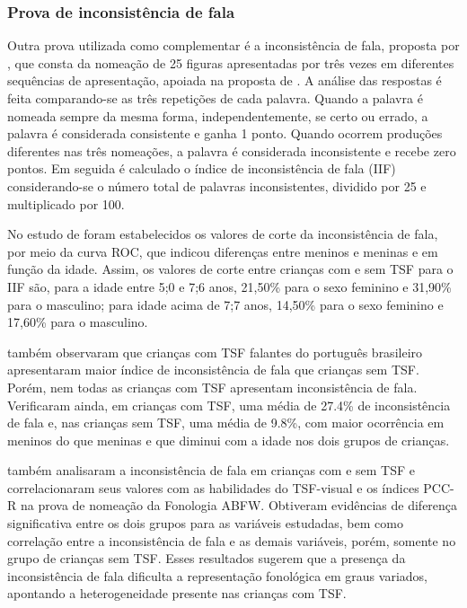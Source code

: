 \documentclass[output=paper,colorlinks,citecolor=brown,booklanguage=portuguese]{langscibook}
\begin{document}
\subsubsection{Prova de inconsistência de fala}
Outra prova utilizada como complementar é a inconsistência de fala, proposta por \citet{Castro2011}, que consta da nomeação de 25 figuras apresentadas por três vezes em diferentes sequências de apresentação, apoiada na proposta de \citet{Dodd2005}. A análise das respostas é feita comparando-se as três repetições de cada palavra. Quando a palavra é nomeada sempre da mesma forma, independentemente, se certo ou errado, a palavra é considerada consistente e ganha 1 ponto. Quando ocorrem produções diferentes nas três nomeações, a palavra é considerada inconsistente e recebe zero pontos. Em seguida é calculado o índice de inconsistência de fala (IIF) considerando-se o número total de palavras inconsistentes, dividido por 25 e multiplicado por 100.

No estudo de \citet{Castro2011} foram estabelecidos os valores de corte da inconsistência de fala, por meio da curva ROC, que indicou diferenças entre meninos e meninas e em função da idade. Assim, os valores de corte entre crianças com e sem TSF para o IIF são, para a idade entre 5;0 e 7;6 anos, 21,50\% para o sexo feminino e 31,90\% para o masculino; para idade acima de 7;7 anos, 14,50\% para o sexo feminino e 17,60\% para o masculino.

\citet{Castro2011} também observaram que crianças com TSF falantes do português brasileiro apresentaram maior índice de inconsistência de fala que crianças sem TSF. Porém, nem todas as crianças com TSF apresentam inconsistência de fala. Verificaram ainda, em crianças com TSF, uma média de 27.4\% de inconsistência de fala e, nas crianças sem TSF, uma média de 9.8\%, com maior ocorrência em meninos do que meninas e que diminui com a idade nos dois grupos de crianças.

\citet{Wertzner2012} também analisaram a inconsistência de fala em crianças com e sem TSF e correlacionaram seus valores com as habilidades do TSF-visual \citep{Herrero2001} e os índices PCC-R na prova de nomeação da Fonologia ABFW. Obtiveram evidências de diferença significativa entre os dois grupos para as variáveis estudadas, bem como correlação entre a inconsistência de fala e as demais variáveis, porém, somente no grupo de crianças sem TSF.  Esses resultados sugerem que a presença da inconsistência de fala dificulta a representação fonológica em graus variados, apontando a heterogeneidade presente nas crianças com TSF.
\end{document}
